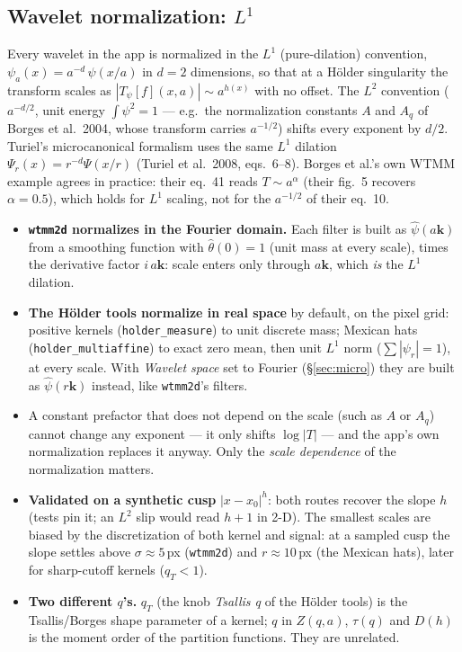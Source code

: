 \documentclass[10pt]{article}
\newcommand{\dev}[1]{\texttt{#1}}
\begin{document}
\subsection*{Wavelet normalization: $L^1$}
Every wavelet in the app is normalized in the $L^1$ (pure-dilation) convention,
$\psi_a(x)=a^{-d}\,\psi(x/a)$ in $d=2$ dimensions, so that at a H\"older singularity the
transform scales as $|T_\psi[f](x,a)|\sim a^{h(x)}$ with no offset. The $L^2$ convention
($a^{-d/2}$, unit energy $\int\psi^2=1$ --- e.g.\ the normalization constants $A$ and
$A_q$ of Borges et al.\ 2004, whose transform carries $a^{-1/2}$) shifts every exponent by
$d/2$. Turiel's microcanonical formalism uses the same $L^1$ dilation
$\Psi_r(x)=r^{-d}\Psi(x/r)$ (Turiel et al.\ 2008, eqs.~6--8). Borges et al.'s own WTMM
example agrees in practice: their eq.~41 reads $T\sim a^{\alpha}$ (their fig.~5 recovers
$\alpha=0.5$), which holds for $L^1$ scaling, not for the $a^{-1/2}$ of their eq.~10.
\begin{itemize}\itemsep2pt
  \item \textbf{\dev{wtmm2d} normalizes in the Fourier domain.} Each filter is built as
        $\hat\psi(a\mathbf{k})$ from a smoothing function with $\hat\theta(0)=1$
        (unit mass at every scale), times the derivative factor $i\,a\mathbf{k}$: scale
        enters only through $a\mathbf{k}$, which \emph{is} the $L^1$ dilation.
  \item \textbf{The H\"older tools normalize in real space} by default, on the pixel grid:
        positive kernels (\dev{holder\_measure}) to unit discrete mass; Mexican hats
        (\dev{holder\_multiaffine}) to exact zero mean, then unit $L^1$ norm
        ($\sum|\psi_r|=1$), at every scale. With \emph{Wavelet space} set to Fourier
        (\S\ref{sec:micro}) they are built as $\hat\psi(r\mathbf{k})$ instead, like
        \dev{wtmm2d}'s filters.
  \item A constant prefactor that does not depend on the scale (such as $A$ or $A_q$)
        cannot change any exponent --- it only shifts $\log|T|$ --- and the app's own
        normalization replaces it anyway. Only the \emph{scale dependence} of the
        normalization matters.
  \item \textbf{Validated on a synthetic cusp} $|x-x_0|^h$: both routes recover the slope $h$
        (tests pin it; an $L^2$ slip would read $h+1$ in 2-D). The smallest scales are biased
        by the discretization of both kernel and signal: at a sampled cusp the slope settles
        above $\sigma\approx5$\,px (\dev{wtmm2d}) and $r\approx10$\,px (the Mexican hats), later
        for sharp-cutoff kernels ($q_T<1$).
  \item \textbf{Two different $q$'s.} $q_T$ (the knob \emph{Tsallis q} of the H\"older tools)
        is the Tsallis/Borges shape parameter of a kernel; $q$ in $Z(q,a)$, $\tau(q)$ and
        $D(h)$ is the moment order of the partition functions. They are unrelated.
\end{itemize}
\end{document}
